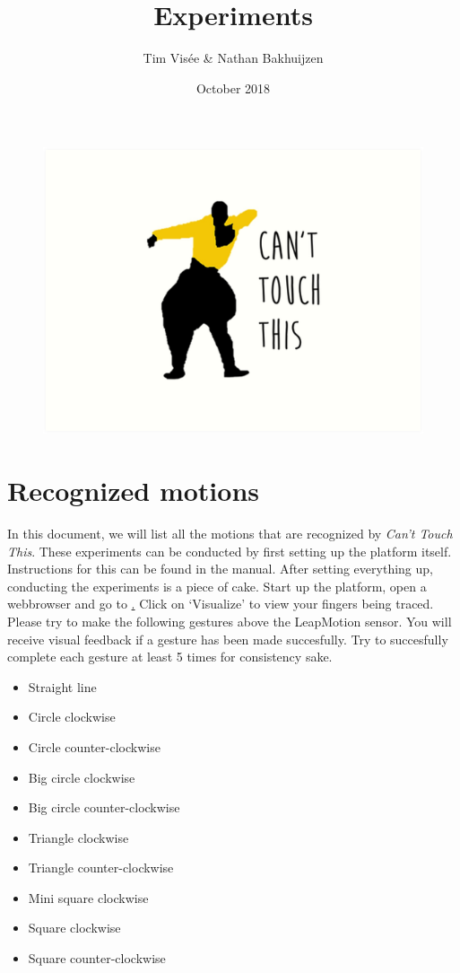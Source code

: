 \documentclass[a4paper]{article}
\title{Experiments}
\author{Tim Visée \& Nathan Bakhuijzen}
\date{October 2018}
\providecommand{\tightlist}{%
\setlength{\itemsep}{0pt}\setlength{\parskip}{0pt}}
\begin{document}
  \maketitle
  \begin{figure}[h]
    \centering
    \includegraphics[width=\linewidth]{cant-touch-this}
  \end{figure}
  \clearpage

  \section{Recognized motions}
  In this document, we will list all the motions that are recognized by
  \textit{Can't Touch This}. These experiments can be conducted by first setting
  up the platform itself. Instructions for this can be found in the manual.
  After setting everything up, conducting the experiments is a piece of cake.
  Start up the platform, open a webbrowser and go to
  \href{http://localhost:8000}. Click on `Visualize' to view your fingers being
  traced.\\

  Please try to make the following gestures above the LeapMotion sensor. You
  will receive visual feedback if a gesture has been made succesfully. Try to
  succesfully complete each gesture at least 5 times for consistency sake.

  \begin{itemize}
    \tightlist
    \item Straight line
    \item Circle clockwise
    \item Circle counter-clockwise
    \item Big circle clockwise
    \item Big circle counter-clockwise
    \item Triangle clockwise
    \item Triangle counter-clockwise
    \item Mini square clockwise
    \item Square clockwise
    \item Square counter-clockwise
  \end{itemize}
\end{document}
